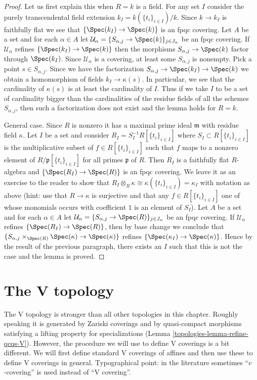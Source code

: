 \begin{proof}
Let us first explain this when $R = k$ is a field. For any set $I$ consider
the purely transcendental field extension
$k_I = k(\{t_i\}_{i \in I})/k$. Since $k \to k_I$ is faithfully flat
we see that $\{\Spec(k_I) \to \Spec(k)\}$ is an fpqc covering.
Let $A$ be a set and for each $\alpha \in A$ let
$\mathcal{U}_\alpha = \{S_{\alpha, j} \to \Spec(k)\}_{j \in J_\alpha}$ be an
fpqc covering. If $\mathcal{U}_\alpha$ refines $\{\Spec(k_I) \to \Spec(k)\}$
then the morphisms $S_{\alpha, j} \to \Spec(k)$ factor through
$\Spec(k_I)$. Since $\mathcal{U}_\alpha$ is a covering,
at least some $S_{\alpha, j}$ is nonempty. Pick a
point $s \in S_{\alpha, j}$. Since we have the factorization
$S_{\alpha, j} \to \Spec(k_I) \to \Spec(k)$
we obtain a homomorphism of fields $k_I \to \kappa(s)$.
In particular, we see that the cardinality of $\kappa(s)$
is at least the cardinality of $I$. Thus if we take $I$ to be a set
of cardinality bigger than the cardinalities of the residue fields
of all the schemes $S_{\alpha, j}$, then such a factorization does
not exist and the lemma holds for $R = k$.

\medskip\noindent
General case. Since $R$ is nonzero it has a maximal prime ideal
$\mathfrak m$ with residue field $\kappa$. Let $I$ be a set and
consider $R_I = S_I^{-1} R[\{t_i\}_{i \in I}]$
where $S_I \subset R[\{t_i\}_{i \in I}]$ is the multiplicative
subset of $f \in R[\{t_i\}_{i \in I}]$ such that $f$ maps to
a nonzero element of $R/\mathfrak p[\{t_i\}_{i \in I}]$ for
all primes $\mathfrak p$ of $R$. Then $R_I$ is a faithfully
flat $R$-algebra and $\{\Spec(R_I) \to \Spec(R)\}$ is an
fpqc covering. We leave it as an exercise to the reader to show that
$R_I \otimes_R \kappa \cong \kappa(\{t_i\}_{i \in I}) = \kappa_I$
with notation as above (hint: use that $R \to \kappa$ is surjective
and that any $f \in R[\{t_i\}_{i \in I}]$ one of whose monomials occurs
with coefficient $1$ is an element of $S_I$). Let $A$ be a set and
for each $\alpha \in A$ let
$\mathcal{U}_\alpha = \{S_{\alpha, j} \to \Spec(R)\}_{j \in J_\alpha}$ be an
fpqc covering. If $\mathcal{U}_\alpha$ refines $\{\Spec(R_I) \to \Spec(R)\}$,
then by base change we conclude that
$\{S_{\alpha, j} \times_{\Spec(R)} \Spec(\kappa) \to \Spec(\kappa)\}$
refines $\{\Spec(\kappa_I) \to \Spec(\kappa)\}$.
Hence by the result of the previous paragraph, there exists an $I$
such that this is not the case and the lemma is proved.
\end{proof}

\section{The V topology}
\label{topologies-section-V}
The V topology is stronger than all other topologies in this chapter.
Roughly speaking it is generated by Zariski coverings and
by quasi-compact morphisms satisfying a lifting property
for specializations (Lemma \ref{topologies-lemma-refine-qcqs-V}).
However, the procedure we will use to define V coverings is a bit different.
We will first define standard V coverings of affines and then
use these to define V coverings in general. Typographical point:
in the literature sometimes ``$v$-covering'' is used instead of ``V covering''.

